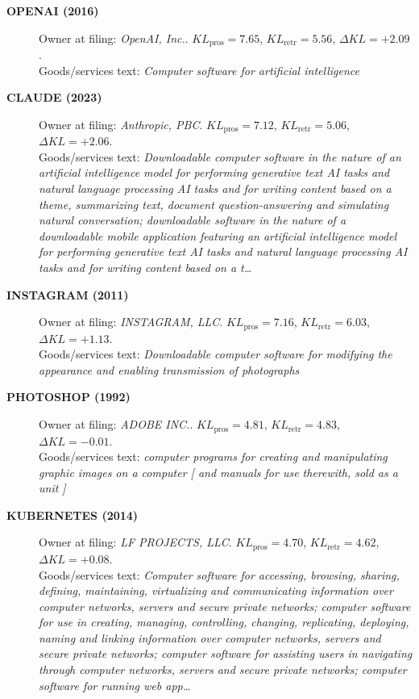 \begin{description}
\item[\textbf{OPENAI (2016)}] Owner at filing: \emph{OpenAI, Inc.}. $KL_{\text{pros}}=7.65$, $KL_{\text{retr}}=5.56$, $\Delta KL=+2.09$.\\
Goods/services text: \emph{Computer software for artificial intelligence}\\

\item[\textbf{CLAUDE (2023)}] Owner at filing: \emph{Anthropic, PBC}. $KL_{\text{pros}}=7.12$, $KL_{\text{retr}}=5.06$, $\Delta KL=+2.06$.\\
Goods/services text: \emph{Downloadable computer software in the nature of an artificial intelligence model for performing generative text AI tasks and natural language processing AI tasks and for writing content based on a theme, summarizing text, document question-answering and simulating natural conversation; downloadable software in the nature of a downloadable mobile application featuring an artificial intelligence model for performing generative text AI tasks and natural language processing AI tasks and for writing content based on a t…}\\

\item[\textbf{INSTAGRAM (2011)}] Owner at filing: \emph{INSTAGRAM, LLC}. $KL_{\text{pros}}=7.16$, $KL_{\text{retr}}=6.03$, $\Delta KL=+1.13$.\\
Goods/services text: \emph{Downloadable computer software for modifying the appearance and enabling transmission of photographs}\\

\item[\textbf{PHOTOSHOP (1992)}] Owner at filing: \emph{ADOBE INC.}. $KL_{\text{pros}}=4.81$, $KL_{\text{retr}}=4.83$, $\Delta KL=-0.01$.\\
Goods/services text: \emph{computer programs for creating and manipulating graphic images on a computer [ and manuals for use therewith, sold as a unit ]}\\

\item[\textbf{KUBERNETES (2014)}] Owner at filing: \emph{LF PROJECTS, LLC}. $KL_{\text{pros}}=4.70$, $KL_{\text{retr}}=4.62$, $\Delta KL=+0.08$.\\
Goods/services text: \emph{Computer software for accessing, browsing, sharing, defining, maintaining, virtualizing and communicating information over computer networks, servers and secure private networks; computer software for use in creating, managing, controlling, changing, replicating, deploying, naming and linking information over computer networks, servers and secure private networks; computer software for assisting users in navigating through computer networks, servers and secure private networks; computer software for running web app…}\\


\end{description}
